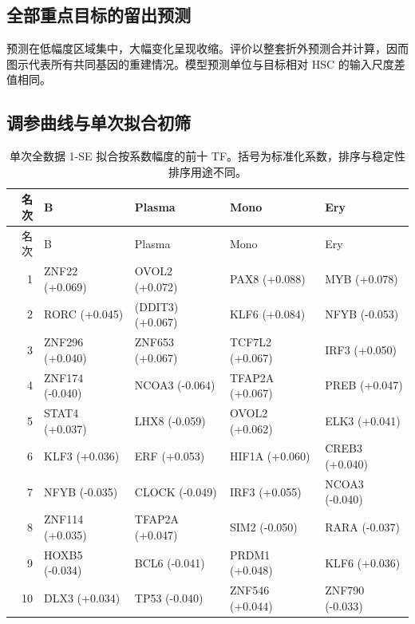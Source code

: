 \clearpage\subsection{全部重点目标的留出预测}
预测在低幅度区域集中，大幅变化呈现收缩。评价以整套折外预测合并计算，因而图示代表所有共同基因的重建情况。模型预测单位与目标相对 HSC 的输入尺度差值相同。
\clearpage\subsection{调参曲线与单次拟合初筛}
{\footnotesize\linespread{1}\selectfont\setlength{\tabcolsep}{4pt}\renewcommand{\arraystretch}{1.08}\begin{longtable}{rllll}\caption{单次全数据 1-SE 拟合按系数幅度的前十 TF。括号为标准化系数，排序与稳定性排序用途不同。}\\\toprule 名次 & B & Plasma & Mono & Ery\\\midrule\endfirsthead\toprule 名次 & B & Plasma & Mono & Ery\\\midrule\endhead
1 & ZNF22 (+0.069) & OVOL2 (+0.072) & PAX8 (+0.088) & MYB (+0.078)\\
2 & RORC (+0.045) & (DDIT3) (+0.067) & KLF6 (+0.084) & NFYB (-0.053)\\
3 & ZNF296 (+0.040) & ZNF653 (+0.067) & TCF7L2 (+0.067) & IRF3 (+0.050)\\
4 & ZNF174 (-0.040) & NCOA3 (-0.064) & TFAP2A (+0.067) & PREB (+0.047)\\
5 & STAT4 (+0.037) & LHX8 (-0.059) & OVOL2 (+0.062) & ELK3 (+0.041)\\
6 & KLF3 (+0.036) & ERF (+0.053) & HIF1A (+0.060) & CREB3 (+0.040)\\
7 & NFYB (-0.035) & CLOCK (-0.049) & IRF3 (+0.055) & NCOA3 (-0.040)\\
8 & ZNF114 (+0.035) & TFAP2A (+0.047) & SIM2 (-0.050) & RARA (-0.037)\\
9 & HOXB5 (-0.034) & BCL6 (-0.041) & PRDM1 (+0.048) & KLF6 (+0.036)\\
10 & DLX3 (+0.034) & TP53 (-0.040) & ZNF546 (+0.044) & ZNF790 (-0.033)\\
\bottomrule\end{longtable}}
